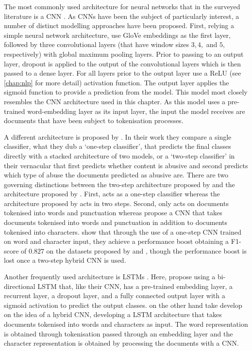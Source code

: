 The most commonly used architecture for neural networks that in the surveyed literature is a CNN \citep{Park:2017,Gamback:2017,Wulczyn:2017,Kolhatkar:2021,Zimmerman:2018,Wang:2020}. As CNNs have been the subject of particularly interest, a number of distinct modelling approaches have been proposed. First, relying a simple neural network architecture, \citet{Kolhatkar:2021} use GloVe embeddings as the first layer, followed by three convolutional layers (that have window sizes $3, 4,$ and $5$, respectively) with global maximum pooling layers. Prior to passing to an output layer, dropout is applied to the output of the convolutional layers which is then passed to a dense layer. For all layers prior to the output layer use a ReLU (see \autoref{chap:nlp} for more detail) activation function. The output layer applies the sigmoid function to provide a prediction from the model. This model most closely resembles the CNN architecture used in this chapter. As this model uses a pre-trained word-embedding layer as its input layer, the input the model receives are documents that have been subject to tokenisation processes.

A different architecture is proposed by \citet{Park:2017}. In their work they compare a single classifier, what they dub a `one-step classifier', that predicts the final classes directly with a stacked architecture of two models, or a `two-step classifier' in their vernacular that first predicts whether content is abusive and second predicts which type of abuse the documents predicted as abusive are. There are two governing distinctions between the two-step architecture proposed by \citet{Park:2017} and the architecture proposed by \citet{Kolhatkar:2021}. First, \citet{Kolhatkar:2021} acts as a one-step classifier whereas the architecture proposed by \citet{Park:2017} acts in two steps. Second, \citet{Kolhatkar:2021} only acts on documents tokenised into words and punctuation whereas \citet{Park:2017} propose a CNN that takes documents tokenised into words and punctuation in addition to documents tokenised into characters. \citet{Park:2017} show that through the use of a one-step CNN trained on word and character input, they achieve a performance boost obtaining a F1-score of $0.827$ on the datasets proposed by \citet{Waseem-Hovy:2016} and \citet{Waseem:2016}, though the performance boost is lost once a two-step hybrid CNN is used.

Another frequently used architecture is LSTMs \citep{Badjatiya:2017,Kolhatkar:2021,Meyer:2019}. Here, \citet{Kolhatkar:2021} propose using a bi-directional LSTM that, like their CNN, has a pre-trained embedding layer, a recurrent layer, a dropout layer, and a fully connected output layer with a sigmoid activation to predict the output classes. \citet{Meyer:2019} on the other hand take develop on the idea of a hybrid CNN, developing a LSTM architecture that takes documents tokenised into words and characters as input. The word representation is obtained through tokenisation passed through an embedding layer and the character representation is obtained by processing the documents with a CNN.

